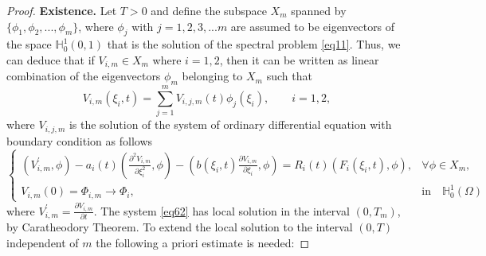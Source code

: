 \documentclass[preprint,12pt,authoryear]{elsarticle}
\begin{document}
\begin{proof}
    \textbf{Existence.} Let $T>0$ and define the subspace $X_m$ spanned by $\{\phi_1,\phi_2,...,\phi_m\}$, where $\phi_j$ with $j=1,2,3,...m$ are assumed to be eigenvectors of the space $\mathbb{H}_0^1(0,1)$ that is the solution of the spectral problem \eqref{eq11}. Thus, we can deduce that if $V_{i,m}\in X_m$ where $i=1,2$, then it can be written as linear combination of the eigenvectors $\phi_m$ belonging to $X_m$ such that
    $$V_{i,m}(\xi_i,t)=\sum\limits_{j=1}^m V_{i,j,m}(t)\phi_j(\xi_i),\quad\quad i=1,2,$$
    where $V_{i,j,m}$ is the solution of the system of ordinary differential equation with boundary condition as follows
    \begin{equation}\label{eq62}
        \begin{cases}
            \left(V_{i,m}^{\prime},\phi\right)-a_i(t)\left(\frac{\partial^2 V_{i,m}}{\partial \xi_i^2},\phi\right)-\left(b(\xi_i,t)\frac{\partial V_{i,m}}{\partial \xi_i},\phi\right)=R_i(t)\left(F_i(\xi_i,t),\phi\right),& \forall\phi\in X_m,\\
            V_{i,m}(0)=\Phi_{i,m}\rightarrow \Phi_i,& \text{in}\quad \mathbb{H}_0^1(\Omega) 
        \end{cases}
    \end{equation}
    where $V_{i,m}^{\prime}=\frac{\partial V_{i,m}}{\partial t}$. The system \eqref{eq62}  has local solution in the interval $(0,T_m)$, by Caratheodory Theorem. To extend the local solution to the interval $(0,T)$ independent of $m$ the
    following a priori estimate is needed:


\end{proof}
\end{document}

